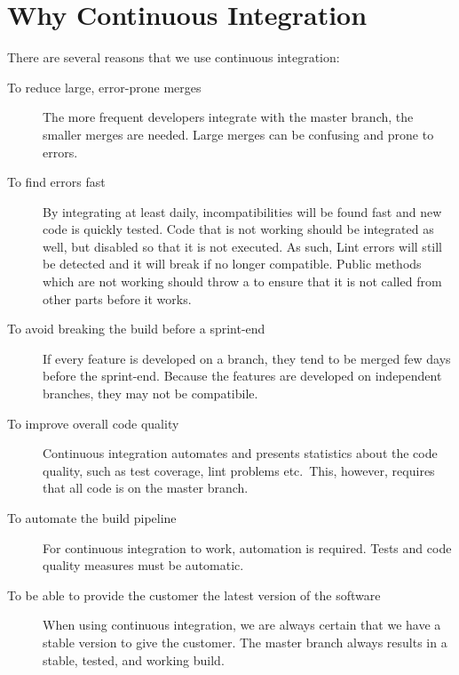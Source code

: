 \section{Why Continuous Integration}
There are several reasons that we use continuous integration:
\begin{description}
  \item[To reduce large, error-prone merges] The more frequent developers integrate with the master branch, the smaller merges are needed. Large merges can be confusing and prone to errors.
  \item[To find errors fast] By integrating at least daily, incompatibilities will be found fast and new code is quickly tested. Code that is not working should be integrated as well, but disabled so that it is not executed. As such, Lint errors will still be detected and it will break if no longer compatible. Public methods which are not working should throw a  to ensure that it is not called from other parts before it works.
  \item[To avoid breaking the build before a sprint-end] If every feature is developed on a branch, they tend to be merged few days before the sprint-end. Because the features are developed on independent branches, they may not be compatibile.
  \item[To improve overall code quality] Continuous integration automates and presents statistics about the code quality, such as test coverage, lint problems etc.\ This, however, requires that all code is on the master branch.
  \item[To automate the build pipeline] For continuous integration to work, automation is required. Tests and code quality measures must be automatic.
  \item[To be able to provide the customer the latest version of the software] When using continuous integration, we are always certain that we have a stable version to give the customer. The master branch always results in a stable, tested, and working build.
\end{description}